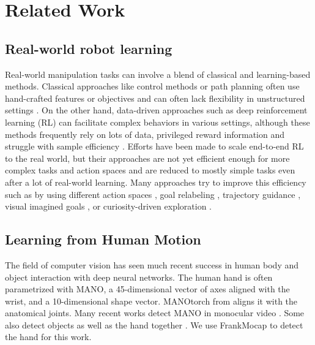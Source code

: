 \section{Related Work}
\label{sec:related_work}

\subsection{Real-world robot learning}
Real-world manipulation tasks can involve a blend of classical and learning-based methods. Classical approaches like control methods or path planning often use hand-crafted features or objectives and can often lack flexibility in unstructured settings \cite{karaman2011anytime, kuffner2000rrt, mukadam2016gaussian}. On the other hand, data-driven approaches such as deep reinforcement learning (RL) can facilitate complex behaviors in various settings, although these methods frequently rely on lots of data, privileged reward information and struggle with sample efficiency \cite{kober2008primitives, peters2010reps, lillicrap2015continuous,popov2017dataefficient, pathakICMl17curiosity}. Efforts have been made to scale end-to-end RL  \cite{levine2016learning, nair2018visual, agrawal2016learning, haarnoja2017sql, kalashnikov2018qt, kalashnikov2021mt} to the real world, but their approaches are not yet efficient enough for more complex tasks and action spaces and are reduced to mostly simple tasks even after a lot of real-world learning.  Many approaches try to improve this efficiency such as by using different action spaces \cite{vices2019martin}, goal relabeling \cite{her}, trajectory guidance \cite{levine2013guided}, visual imagined goals \cite{nair2018visual}, or curiosity-driven exploration \cite{mendonca2023alan}.

\subsection{Learning from Human Motion}
The field of computer vision has seen much recent success in human body and object interaction with deep neural networks.  The human hand is often parametrized with MANO, a 45-dimensional vector \cite{MANO:SIGGRAPHASIA:2017} of axes aligned with the wrist, and a 10-dimensional shape vector. MANOtorch from \cite{yang2021cpf} aligns it with the anatomical joints.   Many recent works detect MANO in monocular video \citep{wang2020rgb2hands, hmr, FrankMocap_2021_ICCV}.  Some also detect objects as well as the hand together \cite{100doh, ye2022s}.  We use FrankMocap to detect the hand for this work. 

